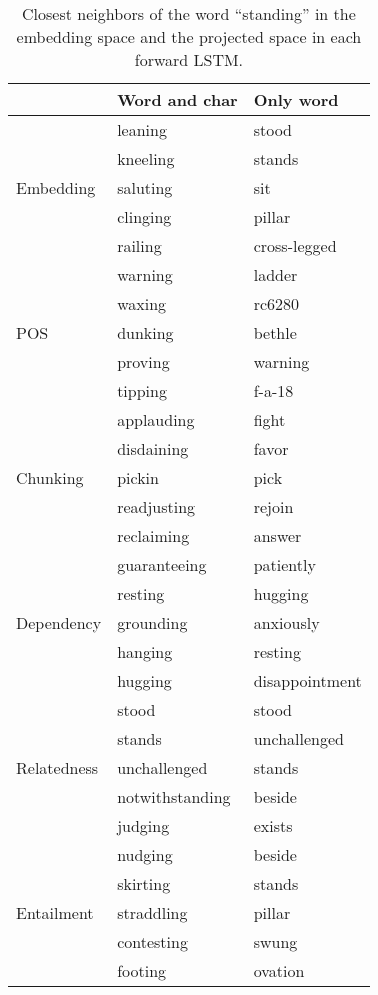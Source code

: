 \documentclass[11pt,a4paper]{article}
\begin{document}
\begin{table}[t]
  \begin{center}
\begin{tabular}{l|l|l}
 			   & Word and char & Only word \\ \hline
    		   & leaning  & stood \\
        	   & kneeling & stands \\
    Embedding  & saluting & sit \\
    		   & clinging & pillar \\
    		   & railing  & cross-legged \\ \hline

			   & warning  & ladder \\
               & waxing   & rc6280 \\
    POS        & dunking  & bethle \\
    		   & proving  & warning \\
               & tipping  & f-a-18 \\ \hline

			   & applauding  & fight \\
               & disdaining  & favor \\
    Chunking   & pickin      & pick \\
    		   & readjusting & rejoin \\
               & reclaiming  & answer \\ \hline

			   & guaranteeing & patiently \\
               & resting      & hugging \\
	Dependency & grounding    & anxiously \\
               & hanging      & resting \\
               & hugging      & disappointment \\ \hline

							& stood           & stood \\
                            & stands          & unchallenged \\
	Relatedness			    & unchallenged    & stands \\
    						& notwithstanding & beside \\
                            & judging         & exists \\ \hline

							& nudging    & beside \\
                            & skirting   & stands \\
	Entailment			    & straddling & pillar \\
    						& contesting & swung \\
                            & footing    & ovation \\ \hline
  \end{tabular}
\caption{Closest neighbors of the word ``standing'' in the embedding space and the projected space in each forward LSTM.}
    \label{tb:knn}
  \end{center}
\end{table}
\end{document}
